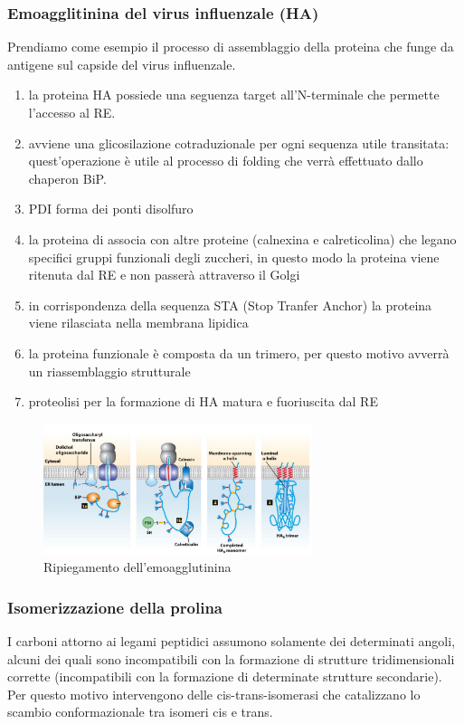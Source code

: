         \subsubsection{Emoagglitinina del virus influenzale (HA)}
            Prendiamo come esempio il processo di assemblaggio della proteina che funge da antigene sul capside del virus influenzale. 
            \begin{enumerate}
                \item la proteina HA possiede una seguenza target all'N-terminale che permette l'accesso al RE. 
                \item avviene una glicosilazione cotraduzionale per ogni sequenza utile transitata: quest'operazione è utile al processo di folding che verrà effettuato dallo chaperon BiP.
                \item PDI forma dei ponti disolfuro
                \item la proteina di associa con altre proteine (calnexina e calreticolina) che legano specifici gruppi funzionali degli zuccheri, in questo modo la proteina viene ritenuta dal RE e non passerà attraverso il Golgi
                \item in corrispondenza della sequenza STA (Stop Tranfer Anchor) la proteina viene rilasciata nella membrana lipidica 
                \item la proteina funzionale è composta da un trimero, per questo motivo avverrà un riassemblaggio strutturale 
                \item proteolisi per la formazione di HA matura e fuoriuscita dal RE
            \end{enumerate}
                \begin{figure}[h]
                \centering
                \includegraphics[width=0.7\textwidth]{images/ripiegamentoHA.JPG}
                \caption{\small Ripiegamento dell'emoagglutinina}
                \label{fig:mesh1}
            \end{figure}
        
        
        \subsubsection{Isomerizzazione della prolina}
            I carboni attorno ai legami peptidici assumono solamente dei determinati angoli, alcuni dei quali sono incompatibili con la formazione di strutture tridimensionali corrette (incompatibili con la formazione di determinate strutture secondarie). 
            Per questo motivo intervengono delle cis-trans-isomerasi che catalizzano lo scambio conformazionale tra isomeri cis e trans.
        
